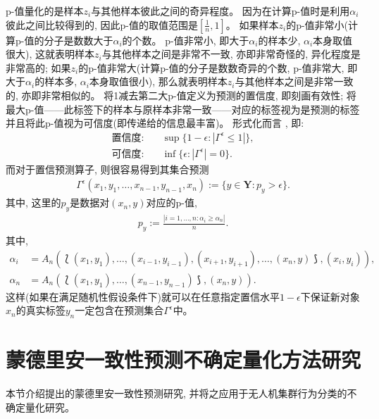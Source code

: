 p-值量化的是样本$z_{i}$与其他样本彼此之间的奇异程度。 因为在计算p-值时是利用$\alpha_{i}$彼此之间比较得到的, 因此p-值的取值范围是$[\frac{1}{n}, 1]$。 如果样本$z_{i}$的p-值非常小(计算p-值的分子是数数大于$\alpha_{i}$的个数。 p-值非常小, 即大于$\alpha_{i}$的样本少, $\alpha_{i}$本身取值很大), 这就表明样本$z_{i}$与其他样本之间是非常不一致, 亦即非常奇怪的, 异化程度是非常高的; 如果$z_{i}$的p-值非常大(计算p-值的分子是数数奇异的个数, p-值非常大, 即大于$\alpha_{i}$的样本多, $\alpha_{i}$本身取值很小), 那么就表明样本$z_{i}$与其他样本之间是非常一致的, 亦即非常相似的。 将1减去第二大p-值定义为预测的置信度, 即刻画有效性; 将最大p-值——此标签下的样本与原样本非常一致——对应的标签视为是预测的标签并且将此p-值视为可信度(即传递给的信息最丰富)。 形式化而言 \citep{2006Hedging}, 即:
\begin{align}
\textsf{置信度:} \quad &\sup\{1-\epsilon: |\Gamma^{\epsilon} \leq 1|\}, \\
\textsf{可信度:} \quad &\inf\{\epsilon: |\Gamma^{\epsilon}| = 0\}.
\end{align}
而对于置信预测算子, 则很容易得到其集合预测
\begin{align}
\Gamma^{\epsilon}(x_{1}, y_{1}, \ldots, x_{n-1}, y_{n-1}, x_{n}) := \{y \in \mathbf{Y}: p_{y} > \epsilon\}.
\end{align}
其中, 这里的$p_{y}$是数据对$(x_{n}, y)$对应的p-值, 
\begin{align}
\label{definition-of-py}
p_{y} := \frac{|i = 1, \ldots, n: \alpha_{i} \geq \alpha_{n}|}{n}.
\end{align}
其中,
\begin{align}
\alpha_{i} &= A_{n}(\Lbag (x_{1}, y_{1}), \ldots, (x_{i-1}, y_{i-1}), (x_{i+1}, y_{i+1}), \ldots, (x_{n}, y) \Rbag, (x_{i}, y_{i})),\\
\alpha_{n} &= A_{n}(\Lbag (x_{1}, y_{1}), \ldots, (x_{n-1}, y_{n-1}) \Rbag, (x_{n}, y)).
\end{align}
这样(如果在满足随机性假设条件下)就可以在任意指定置信水平$1 - \epsilon$下保证新对象$x_{n}$的真实标签$y_{n}$一定包含在预测集合$\Gamma^{\epsilon}$中。


\section{蒙德里安一致性预测不确定量化方法研究}
\label{sec:method}
本节介绍提出的蒙德里安一致性预测研究, 并将之应用于无人机集群行为分类的不确定量化研究。

